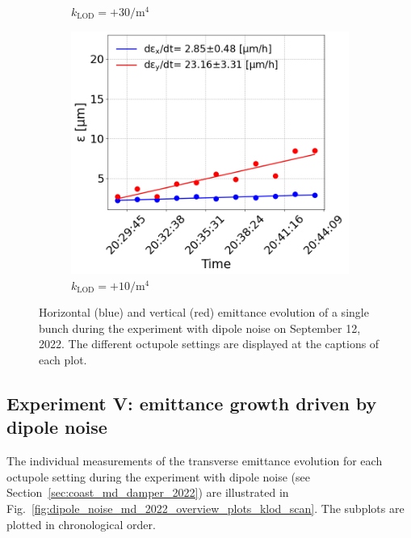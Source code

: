 \begin{figure}[htp]
\begin{subfigure}{.45\textwidth}
            \caption{$k_\mathrm{LOD}=+30  \mathrm{/m^{4}}$}
    \end{subfigure}
    \begin{subfigure}{.45\textwidth}
        \centering
        \includegraphics[width=.95\linewidth]{images/app_c/cc_md_12sep22_coast11.png}  
        \caption{$k_\mathrm{LOD}=+10 \mathrm{/m^{4}}$}
    \end{subfigure}
    \caption{Horizontal (blue) and vertical (red) emittance evolution of a single bunch during the experiment with dipole noise on September 12, 2022.  The different octupole settings are displayed at the captions of each plot.}
    \label{fig:cc_md_12sep2022_overview_plots_klod_scan}
 \end{figure}
 

 \subsection{Experiment V: emittance growth driven by dipole noise}\label{subsec:exp5_coast_md_damper_2022_emittance}
 The individual measurements of the transverse emittance evolution for each octupole setting during the experiment with dipole noise (see Section~\ref{sec:coast_md_damper_2022}) are illustrated in Fig.~\ref{fig:dipole_noise_md_2022_overview_plots_klod_scan}. The subplots are plotted in chronological order.


